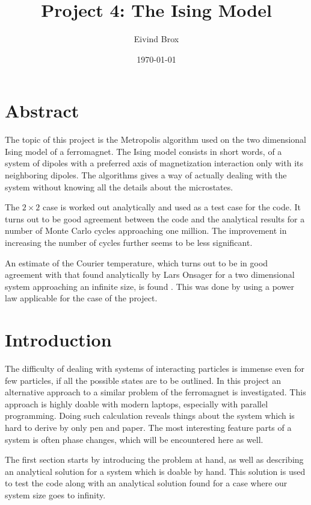 \documentclass[11pt, a4paper]{article}
\author{Eivind Brox}
\title{Project 4: The Ising Model}
\date{\today}
\begin{document}
\maketitle
\thispagestyle{empty}
\clearpage	

\section*{Abstract}
The topic of this project is the Metropolis algorithm used on the two dimensional Ising model of a ferromagnet. The Ising model consists in short words, of a system of dipoles with a preferred axis of magnetization interaction only with its neighboring dipoles. The algorithms gives a way of actually dealing with the system without knowing all the details about the microstates.

The $2\times 2$ case is worked out analytically and used as a test case for the code. It turns out to be good agreement between the code and the analytical results for a number of Monte Carlo cycles approaching one million. The improvement in increasing the number of cycles further seems to be less significant.

An estimate of the Courier temperature, which turns out to be in good agreement with that found analytically by Lars Onsager for a two dimensional system approaching an infinite size, is found . This was done by using a power law applicable for the case of the project. 






\clearpage
\pagestyle{headings}		
\tableofcontents		
\clearpage
{}		

\section{Introduction}
The difficulty of dealing with systems of interacting particles is immense even for few particles, if all the possible states are to be outlined. In this project an alternative approach to a similar problem of the ferromagnet is investigated. This approach is highly doable with modern laptops, especially with parallel programming. Doing such calculation reveals things about the system which is hard to derive by only pen and paper. The most interesting feature parts of a system is often phase changes, which will be encountered here as well.

The first section starts by introducing the problem at hand, as well as describing an analytical solution for a system which is doable by hand. This solution is used to test the code along with an analytical solution found for a case where our system size goes to infinity.
\end{document}
